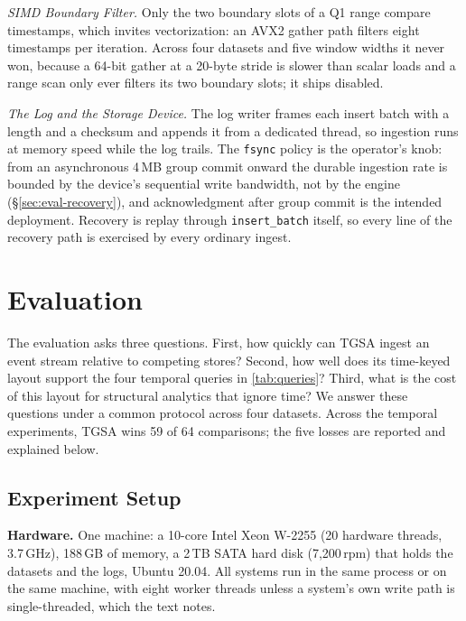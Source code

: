 \documentclass[sigconf,nonacm]{acmart}
\newcommand{\sys}{TGSA\xspace}
\begin{document}
\emph{SIMD Boundary Filter.} Only the two boundary slots of a Q1 range
compare timestamps, which invites vectorization: an AVX2 gather path
filters eight timestamps per iteration. Across four datasets and five
window widths it never won, because a 64-bit gather at a 20-byte
stride is slower than scalar loads and a range scan only ever filters
its two boundary slots; it ships disabled.

\emph{The Log and the Storage Device.} The log writer frames each
insert batch with a length and a checksum and appends it from a
dedicated thread, so ingestion runs at memory speed while the log
trails. The \texttt{fsync} policy is the operator's knob: from an
asynchronous 4\,MB group commit onward the durable ingestion rate is
bounded by the device's sequential write bandwidth, not by the engine
(\S\ref{sec:eval-recovery}), and acknowledgment after group commit is
the intended deployment. Recovery is replay through
\texttt{insert\_batch} itself, so every line of the recovery path is
exercised by every ordinary ingest.

\section{Evaluation}\label{sec:eval}
The evaluation asks three questions. First, how quickly can \sys
ingest an event stream relative to competing stores? Second, how well
does its time-keyed layout support the four temporal queries in
\cref{tab:queries}? Third, what is the cost of this layout for
structural analytics that ignore time? We answer these questions under
a common protocol across four datasets. Across the temporal
experiments, \sys wins 59 of 64 comparisons; the five losses are
reported and explained below.

\subsection{Experiment Setup}\label{sec:eval-setup}
\textbf{Hardware.} One machine: a 10-core Intel Xeon W-2255 (20
hardware threads, 3.7\,GHz), 188\,GB of memory, a 2\,TB SATA hard
disk (7{,}200\,rpm) that holds the datasets and the logs, Ubuntu 20.04.
All systems run in the same process or on the same machine, with eight
worker threads unless a system's own write path is single-threaded,
which the text notes.
\end{document}
